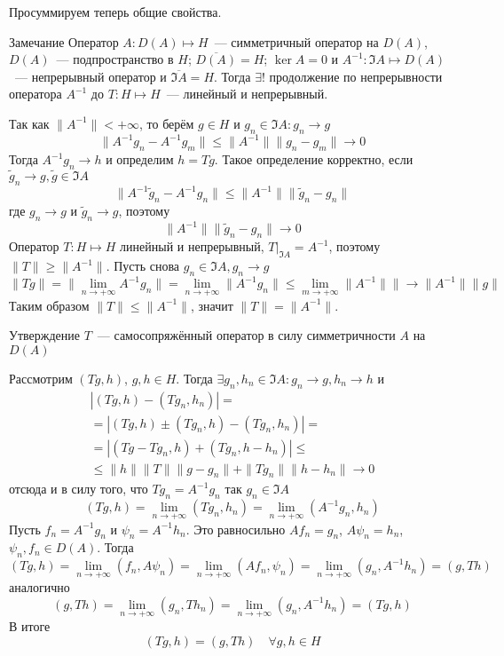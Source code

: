 \documentclass[14pt]{extarticle}
\begin{document}
Просуммируем теперь общие свойства.
\begin{MathCl}{Замечание}
    Оператор $A : D(A) \mapsto H$~--- симметричный оператор на $D(A)$, $D(A)$~--- 
    подпространство в $H$; $\overline{D(A)} = H$; $\ker A = 0$ и $A^{-1} : \Im A \mapsto D(A)
    $~--- непрерывный оператор и $\overline{\Im A} = H$.
    Тогда $\exists!$ продолжение по непрерывности оператора $A^{-1}$ до $T : H \mapsto 
    H$~--- линейный и непрерывный.
\end{MathCl}
\begin{Proof}
    Так как $\|A^{-1}\| < +\infty$, то берём $g \in H$ и $g_n \in \Im A\colon g_n \to g$
    $$
    \|A^{-1}g_n - A^{-1}g_m\| \le \|A^{-1}\|\|g_n - g_m\| \to 0
    $$
    Тогда $A^{-1}g_n \to h$  и определим $h = Tg$.
    Такое определение корректно, если $\tilde{g}_n \to g, \tilde{g} \in \Im A$
    $$
    \|A^{-1}\tilde{g}_n - A^{-1}g_n\| \le \|A^{-1}\|\|\tilde{g}_n - g_n\|
    $$
    где $g_n \to g$ и $\tilde{g}_n \to g$, поэтому
    $$
    \|A^{-1}\| \|\tilde{g}_n - g_n\| \to 0
    $$
    Оператор $T : H \mapsto H$ линейный и непрерывный, $T|_{\Im A} = A^{-1}$, поэтому
    $\|T\| \ge \|A^{-1}\|$.
    Пусть снова $g_n \in \Im A, g_n \to g$
    $$
    \|Tg\| = \|\lim_{n \to +\infty} A^{-1}g_n\| = \lim_{n \to +\infty}\|A^{-1}g_n\| \le
    \lim_{m \to +\infty}\|A^{-1}\|\| \to \|A^{-1}\|\|g\|
    $$
    Таким образом $\|T\| \le \|A^{-1}\|$, значит $\|T\| = \|A^{-1}\|$.
\end{Proof}
\begin{MathCl}{Утверждение}
    $T$~--- самосопряжённый оператор в силу симметричности $A$ на $D(A)$
\end{MathCl}
\begin{Proof}
    Рассмотрим $(Tg, h)$, $g,h \in H$.
    Тогда $\exists g_n, h_n \in \Im A\colon g_n \to g, h_n \to h$ и
    \begin{multline*}
    |(Tg, h) - (Tg_n, h_n)| =\\= |(Tg,h) \pm (Tg_n, h) - (Tg_n, h_n)| =\\= |(Tg - Tg_n,  h) + (Tg_n, 
    h - h_n)|
    \le\\\le \|h\|\|T\|\|g - g_n\|
    + \|T g_n\| \|h - h_n\| \to 0
    \end{multline*}
    отсюда и в силу того, что $Tg_n =A^{-1} g_n$ так $g_n \in \Im A$
    $$
    (Tg, h) = \lim_{n \to +\infty}(Tg_n, h_n) = \lim_{n \to +\infty}(A^{-1}g_n, h_n)
    $$
    Пусть $f_n = A^{-1}g_n$ и $\psi_n = A^{-1} h_n$.
    Это равносильно $Af_n = g_n$, $A\psi_n = h_n$, $\psi_n, f_n \in D(A)$.
    Тогда
    $$
    (Tg, h) = \lim_{n \to +\infty}(f_n, A\psi_n) = \lim_{n \to +\infty}(Af_n, \psi_n) = \lim_{n \to +
    \infty}(g_n, A^{-1}h_n) = (g, Th)
    $$
    аналогично
    $$
    (g, Th) = \lim_{n \to +\infty}(g_n, Th_n) = \lim_{n \to +\infty}(g_n, A^{-1}h_n) = (Tg, h)
    $$
    В итоге 
    $$
    (Tg, h) = (g, Th)\quad \forall g,h \in H
    $$
\end{Proof}
\end{document}
